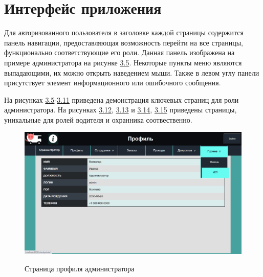 \section{Интерфейс приложения}
Для авторизованного пользователя в заголовке каждой страницы содержится панель навигации, предоставляющая возможность перейти на все страницы, функционально соответствующие его роли. Данная панель изображена на примере администратора на рисунке \hyperref[navbar_sc]{3.5}. Некоторые пункты меню являются выпадающими, их можно открыть наведением мыши. Также в левом углу панели присутствует элемент информационного или ошибочного сообщения.

На рисунках \hyperref[navbar_sc]{3.5}-\hyperref[trucks_sc]{3.11} приведена демонстрация ключевых страниц для роли администратора. На рисунках \hyperref[pick_delivery_sc]{3.12}, \hyperref[driver_profile_sc]{3.13} и \hyperref[guard_duty_sc]{3.14}, \hyperref[guard_duty_sc]{3.15} приведены страницы, уникальные для ролей водителя и охранника соотвественно.

\begin{figure}[h!] \label{navbar_sc}
	\begin{center}
		{\includegraphics[scale=0.45, angle=0]{sc/admin_profile}}
		\caption{Страница профиля администратора}
	\end{center}
\end{figure}

